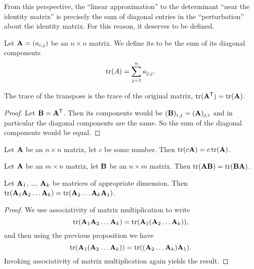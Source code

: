 \begin{remark}
From this perspective, the ``linear approximation'' to the determinant
``near the identity matrix'' is precisely the sum of diagonal entries in
the ``perturbation'' about the identity matrix. For this reason, it
deserves to be defined.
\end{remark}

\begin{definition}
Let $\mathbf{A}=(a_{i,j})$ be an $n\times n$ matrix.
We define its  to be the sum of its diagonal components
\begin{equation}
\mathop{\rm tr}\nolimits(A) = \sum^{n}_{j=1}a_{j,j}.
\end{equation}
\end{definition}

\begin{proposition}
The trace of the transpose is the trace of the original matrix,
$\mathop{\rm tr}\nolimits(\mathbf{A}^{\mathsf{T}})=\mathop{\rm tr}\nolimits(\mathbf{A})$.
\end{proposition}
\begin{proof}
Let $\mathbf{B}=\mathbf{A}^{\mathsf{T}}$. Then its components would be
$(\mathbf{B})_{i,j}=(\mathbf{A})_{j,i}$ and in particular the diagonal
components are the same. So the sum of the diagonal components would be
equal.
\end{proof}

\begin{proposition}
Let $\mathbf{A}$ be an $n\times n$ matrix, let $c$ be some number.
Then $\mathop{\rm tr}\nolimits(c\mathbf{A})=c\mathop{\rm tr}\nolimits(\mathbf{A})$.
\end{proposition}

\begin{proposition}
Let $\mathbf{A}$ be an $m\times n$ matrix, let $\mathbf{B}$ be an $n\times m$ matrix.
Then $\mathop{\rm tr}\nolimits(\mathbf{A}\mathbf{B})=\mathop{\rm tr}\nolimits(\mathbf{B}\mathbf{A})$.
\end{proposition}

\begin{corollary}
Let $\mathbf{A}_{1}$, \dots, $\mathbf{A}_{k}$ be matrices of appropriate
dimension. Then $\mathop{\rm tr}\nolimits(\mathbf{A}_{1}\mathbf{A}_{2}\dots\mathbf{A}_{k})=\mathop{\rm tr}\nolimits(\mathbf{A}_{2}\dots\mathbf{A}_{k}\mathbf{A}_{1})$.
\end{corollary}

\begin{proof}
  We use associativity of matrix multiplication to write
  \begin{equation}
\mathop{\rm tr}\nolimits(\mathbf{A}_{1}\mathbf{A}_{2}\dots\mathbf{A}_{k}) = \mathop{\rm tr}\nolimits(\mathbf{A}_{1}(\mathbf{A}_{2}\dots\mathbf{A}_{k})),
  \end{equation}
  and then using the previous proposition we have
  \begin{equation}
\mathop{\rm tr}\nolimits(\mathbf{A}_{1}(\mathbf{A}_{2}\dots\mathbf{A}_{k})) = \mathop{\rm tr}\nolimits((\mathbf{A}_{2}\dots\mathbf{A}_{k})\mathbf{A}_{1}).
  \end{equation}
  Invoking associativity of matrix multiplication again yields the result.
\end{proof}

